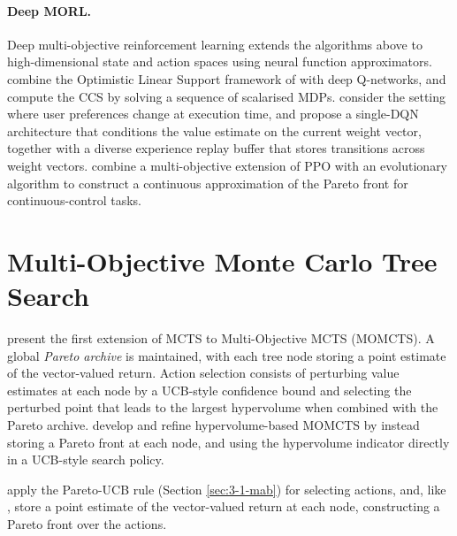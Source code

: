     \paragraph{Deep MORL.}
    Deep multi-objective reinforcement learning extends the algorithms above to high-dimensional state and action spaces using neural function approximators. \citet{mossalam_modrl} combine the Optimistic Linear Support framework of \citet{cccs} with deep Q-networks, and compute the CCS by solving a sequence of scalarised MDPs. \citet{abels_dynamic_weights} consider the setting where user preferences change at execution time, and propose a single-DQN architecture that conditions the value estimate on the current weight vector, together with a diverse experience replay buffer that stores transitions across weight vectors. \citet{xu_prediction_guided} combine a multi-objective extension of PPO with an evolutionary algorithm to construct a continuous approximation of the Pareto front for continuous-control tasks. 




\section{Multi-Objective Monte Carlo Tree Search}
\label{sec:3-5-momcts}

    \citet{og_momcts} present the first extension of MCTS to Multi-Objective MCTS (MOMCTS). A global \textit{Pareto archive} is maintained, with each tree node storing a point estimate of the vector-valued return. Action selection consists of perturbing value estimates at each node by a UCB-style confidence bound and selecting the perturbed point that leads to the largest hypervolume when combined with the Pareto archive. \citet{hv_momcts_1,hv_momcts_2,hv_momcts_3} develop and refine hypervolume-based MOMCTS by instead storing a Pareto front at each node, and using the hypervolume indicator directly in a UCB-style search policy.

    \citet{pareto_momcts} apply the Pareto-UCB rule \cite{pareto_ucb} (Section \ref{sec:3-1-mab}) for selecting actions, and, like \citet{og_momcts}, store a point estimate of the vector-valued return at each node, constructing a Pareto front over the actions. 

